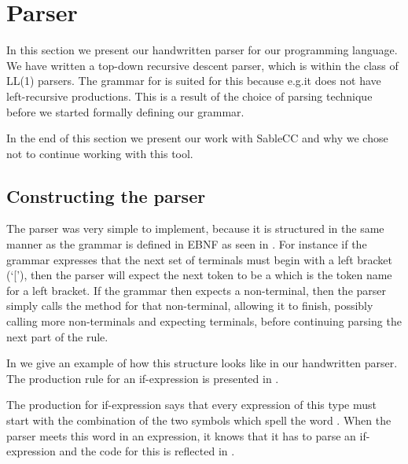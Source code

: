 \section{Parser}

In this section we present our handwritten parser for our programming language.
We have written a top-down recursive descent parser, which is within the class
of LL(1) parsers. The grammar for \productname{} is suited for this because
e.g.\@ it does not have left-recursive productions. This is a result of the
choice of parsing technique before we started formally defining our grammar.

In the end of this section we present our work with SableCC and why we chose not
to continue working with this tool.

\subsection{Constructing the parser}
The parser was very simple to implement, because it is structured in the same
manner as the grammar is defined in EBNF as seen in . For
instance if the grammar expresses that the next set of terminals must begin with
a left bracket (`['), then the parser will expect the next token to be a
   which is the token name for a left bracket. If the grammar
  then expects a non-terminal, then the parser simply calls the method for that
  non-terminal, allowing it to finish, possibly calling more non-terminals and
  expecting terminals, before continuing parsing the next part of the rule.

In  we give an example of how this structure looks like in
our handwritten parser. The production rule for an if-expression is presented in
.


The production for if-expression says that every expression of this type
must start with the combination of the two symbols which spell the word
. When the parser meets this word in an expression, it knows
that it has to parse an if-expression and the code for this is reflected
in .



